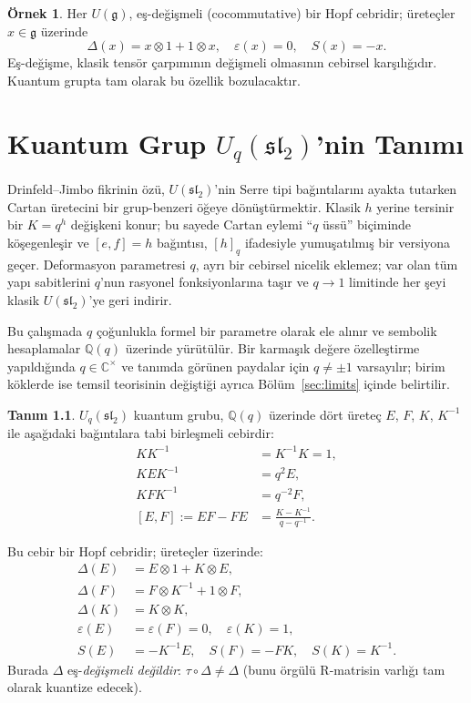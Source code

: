 \documentclass[12pt,a4paper,fleqn]{report}
\newcommand{\normalsemi}{;}
\newcommand{\normalsemi}{\begingroup\semicolonfont;\endgroup}
\numberwithin{equation}{chapter}
\theoremstyle{plain}
\theoremstyle{definition}
\newtheorem{definition}[theorem]{Tanım}
\newtheorem{example}[theorem]{Örnek}
\renewcommand{\sl}{\mathfrak{sl}}
\newcommand{\gfrak}{\mathfrak{g}}
\newcommand{\Uq}{U_q(\sl_2)}
\newcommand{\Q}{\mathbb{Q}}
\newcommand{\C}{\mathbb{C}}
\newcommand{\eps}{\varepsilon}
\newcommand{\cop}{\Delta}
\newcommand{\qint}[1]{[#1]_q}
\begin{document}
\begin{example}
Her $U(\gfrak)$, eş-değişmeli (cocommutative) bir Hopf cebridir\normalsemi{} üreteçler
$x \in \gfrak$ üzerinde
\begin{equation}
  \cop(x) = x \otimes 1 + 1 \otimes x, \quad \eps(x) = 0, \quad S(x) = -x.
\end{equation}
Eş-değişme, klasik tensör çarpımının değişmeli olmasının cebirsel
karşılığıdır. Kuantum grupta tam olarak bu özellik bozulacaktır.
\end{example}

\chapter{Kuantum Grup $\Uq$'nin Tanımı}

Drinfeld--Jimbo fikrinin özü, $U(\sl_2)$'nin Serre tipi bağıntılarını ayakta
tutarken Cartan üretecini bir grup-benzeri öğeye dönüştürmektir. Klasik
$h$ yerine tersinir bir $K = q^h$ değişkeni konur\normalsemi{} bu sayede Cartan eylemi
``$q$ üssü'' biçiminde köşegenleşir ve $[e,f]=h$ bağıntısı, $\qint{h}$
ifadesiyle yumuşatılmış bir versiyona geçer. Deformasyon parametresi $q$, ayrı
bir cebirsel nicelik eklemez\normalsemi{} var olan tüm yapı sabitlerini $q$'nun rasyonel
fonksiyonlarına taşır ve $q\to 1$ limitinde her şeyi klasik $U(\sl_2)$'ye geri
indirir.

Bu çalışmada $q$ çoğunlukla formel bir parametre olarak ele alınır ve sembolik
hesaplamalar $\Q(q)$ üzerinde yürütülür. Bir karmaşık değere özelleştirme
yapıldığında $q\in\C^\times$ ve tanımda görünen paydalar için $q\neq \pm 1$
varsayılır\normalsemi{} birim köklerde ise temsil teorisinin değiştiği ayrıca
Bölüm~\ref{sec:limits} içinde belirtilir.

\begin{definition}\label{def:Uq}
$\Uq$ kuantum grubu, $\Q(q)$ üzerinde dört üreteç $E$, $F$, $K$, $K^{-1}$
ile aşağıdaki bağıntılara tabi birleşmeli cebirdir:
\begin{align}
  K K^{-1} &= K^{-1} K = 1, \tag{R1} \\
  K E K^{-1} &= q^{2} E, \tag{R2} \\
  K F K^{-1} &= q^{-2} F, \tag{R3} \\
  [E, F] := EF - FE &= \frac{K - K^{-1}}{q - q^{-1}}. \tag{R4}
\end{align}
\end{definition}

Bu cebir bir Hopf cebridir\normalsemi{} üreteçler üzerinde:
\begin{align}
  \cop(E) &= E \otimes 1 + K \otimes E, \\
  \cop(F) &= F \otimes K^{-1} + 1 \otimes F, \\
  \cop(K) &= K \otimes K, \\
  \eps(E) &= \eps(F) = 0, \quad \eps(K) = 1, \\
  S(E) &= -K^{-1} E, \quad S(F) = -F K, \quad S(K) = K^{-1}.
\end{align}
Burada $\cop$ eş-\emph{değişmeli değildir}: $\tau \circ \cop \neq \cop$ (bunu
örgülü R-matrisin varlığı tam olarak kuantize edecek).
\end{document}
